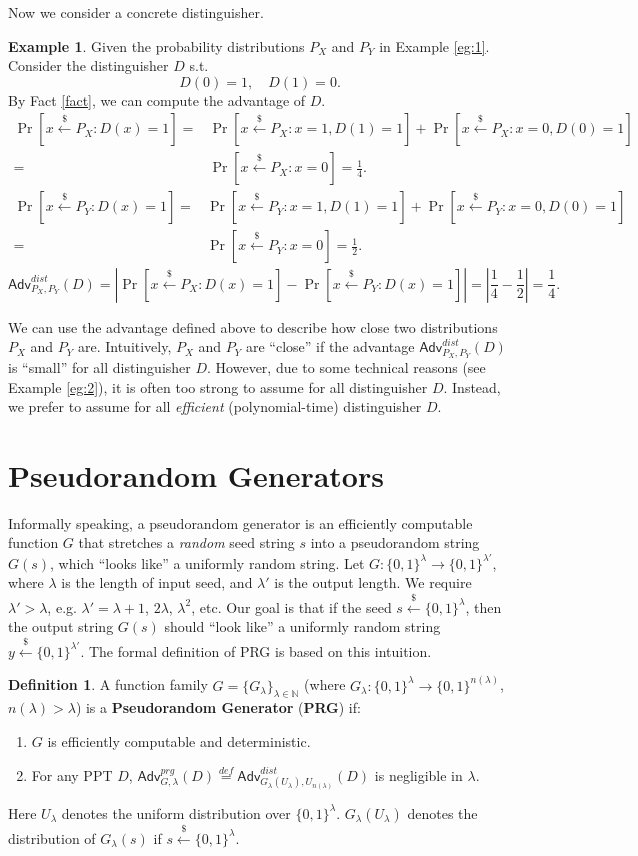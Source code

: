 \documentclass[12pt]{article}
\newcommand{\eqdef}{\stackrel{def}{=}}
\newcommand{\N}{\mathbb{N}}
\newcommand{\bits}{\{0,1\}}
\newcommand{\getsr}{\stackrel{\$}{\gets}}
\newcommand{\Adv}{\textsf{Adv}}
\theoremstyle{definition}
\newtheorem{definition}[theorem]{Definition}
\newtheorem{example}[theorem]{Example}
\begin{document}
Now we consider a concrete distinguisher.
\begin{example}
Given the probability distributions $P_X$ and $P_Y$ in Example \ref{eg:1}. Consider the distinguisher $D$ s.t.
$$D(0)=1, \quad D(1)=0.$$
By Fact \ref{fact}, we can compute the advantage of $D$.
$$
\begin{aligned}
\Pr[x\getsr P_X: D(x)=1] =& \Pr[x\getsr P_X: x=1, D(1)=1] + \Pr[x\getsr P_X: x=0, D(0)=1] \\
=& \Pr[x\getsr P_X: x=0] = \frac{1}{4}.
\end{aligned}
$$
$$
\begin{aligned}
\Pr[x\getsr P_Y: D(x)=1] =& \Pr[x\getsr P_Y: x=1, D(1)=1] + \Pr[x\getsr P_Y: x=0, D(0)=1] \\
=& \Pr[x\getsr P_Y: x=0] =\frac{1}{2}.
\end{aligned}$$
$$\Adv_{P_X,P_Y}^{dist}(D) = \left| \Pr[x\getsr P_X: D(x)=1] - \Pr[x\getsr P_Y: D(x)=1]\right| = \left|\frac{1}{4}-\frac{1}{2}\right| = \frac{1}{4}.$$
\end{example}

We can use the advantage defined above to describe how close two distributions $P_X$ and $P_Y$ are. Intuitively, $P_X$ and $P_Y$ are ``close'' if the advantage $\Adv_{P_X,P_Y}^{dist}(D)$ is ``small'' for all distinguisher $D$. However, due to some technical reasons (see Example \ref{eg:2}), it is often too strong to assume for all distinguisher $D$. Instead, we prefer to assume for all \emph{efficient} (polynomial-time) distinguisher $D$.

\section{Pseudorandom Generators}
Informally speaking, a pseudorandom generator is an efficiently computable function $G$ that stretches a \emph{random} seed string $s$ into a pseudorandom string $G(s)$, which ``looks like'' a uniformly random string. 
Let $G: \bits^\lambda \to \bits^{\lambda'}$, where $\lambda$ is the length of input seed, and $\lambda'$ is the output length. We require $\lambda' > \lambda$, e.g. $\lambda' = \lambda+1$, $2\lambda$, $\lambda^2$, etc. Our goal is that if the seed $s\getsr \bits^\lambda$, then the output string $G(s)$ should ``look like'' a uniformly random string $y\getsr\bits^{\lambda'}$. The formal definition of PRG is based on this intuition.
\begin{definition}
A function family $G = \{G_\lambda\}_{\lambda\in\N}$ (where $G_\lambda : \bits^\lambda \to \bits^{n(\lambda)}$, $n(\lambda)>\lambda$) is a {\bf Pseudorandom Generator} ({\bf PRG}) if:
\begin{enumerate}
\item $G$ is efficiently computable and deterministic.
\item For any PPT $D$, $\Adv_{G,\lambda}^{prg}(D) \eqdef \Adv_{G_\lambda(U_\lambda),U_{n(\lambda)}}^{dist}(D)$ is negligible in $\lambda$.
\end{enumerate}
Here $U_\lambda$ denotes the uniform distribution over $\bits^\lambda$. $G_\lambda(U_\lambda)$ denotes the distribution of $G_\lambda(s)$ if $s\getsr\bits^\lambda$.
\end{definition}
\end{document}

